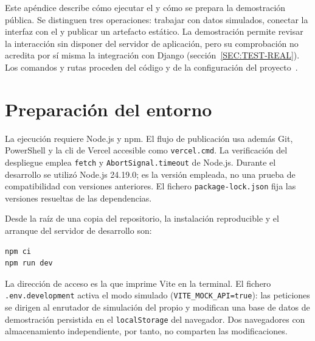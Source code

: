 
Este apéndice describe cómo ejecutar el  y cómo se prepara la
demostración pública. Se distinguen tres operaciones: trabajar con datos
simulados, conectar la interfaz con el  y publicar un artefacto
estático. La demostración permite revisar la interacción sin disponer del
servidor de aplicación, pero su comprobación no acredita por sí misma la
integración con Django (sección~\ref{SEC:TEST-REAL}). Los comandos y rutas
proceden del código y de la configuración del proyecto~\cite{scde_frontend_install_2026}.

\section*{Preparación del entorno}
La ejecución requiere Node.js y npm. El flujo de publicación usa además Git,
PowerShell y la \acs{cli} de Vercel accesible como \texttt{vercel.cmd}. La
verificación del despliegue emplea \texttt{fetch} y
\texttt{AbortSignal.timeout} de Node.js. Durante el desarrollo se utilizó
Node.js 24.19.0; es la versión empleada, no una prueba de compatibilidad con
versiones anteriores. El fichero \texttt{package-lock.json} fija las versiones
resueltas de las dependencias.

Desde la raíz de una copia del repositorio, la instalación reproducible y el
arranque del servidor de desarrollo son:
\begin{verbatim}
npm ci
npm run dev
\end{verbatim}
La dirección de acceso es la que imprime Vite en la terminal. El fichero
\texttt{.env.development} activa el modo simulado
(\texttt{VITE\_MOCK\_API=true}): las peticiones se dirigen al enrutador de
simulación del propio  y modifican una base de datos de
demostración persistida en el \texttt{localStorage} del navegador. Dos
navegadores con almacenamiento independiente, por tanto, no comparten las
modificaciones.

